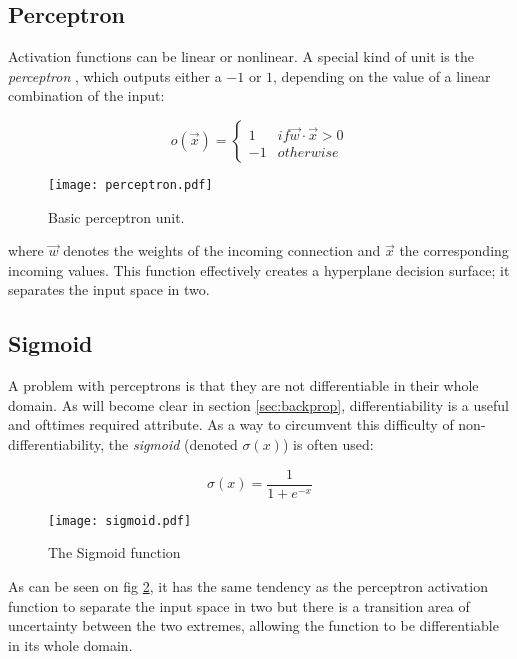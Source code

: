 \subsection{Perceptron}
Activation functions can be linear or nonlinear.
A special kind of unit is the \textit{perceptron}
\parencite{rosenblatt1958perceptron},
which outputs either a $-1$ or $1$,
depending on the value of a linear combination of the input:

\begin{equation}
\label{eq.perceptron}
o(\overrightarrow{x}) = \begin{cases}
1 & if \overrightarrow{w}\cdot\overrightarrow{x} > 0 \\
-1 & otherwise
\end{cases}
\end{equation}

\begin{figure}
\label{fig.ml.perceptron}
\center
\texttt{[image: perceptron.pdf]}
\caption{Basic perceptron unit.}
\end{figure}

where $\overrightarrow{w}$ denotes the weights of the incoming connection
and $\overrightarrow{x}$ the corresponding incoming values.
This function effectively creates a hyperplane decision surface;
it separates the input space in two.

\subsection{Sigmoid}
\label{sec:sigmoid}
A problem with perceptrons
is that they are not differentiable
in their whole domain.
As will become clear in section \ref{sec:backprop},
differentiability is a useful and ofttimes required attribute.
As a way to circumvent this difficulty of non-differentiability,
the \textit{sigmoid} (denoted $\sigma(x)$) is often used:

\begin{equation}
\label{eq.ml.sigmoid}
\sigma(x) = \frac{1}{1 + e^{-x}}
\end{equation}

\begin{figure}[h]
\center
\texttt{[image: sigmoid.pdf]}
\caption{The Sigmoid function}
\label{fig.ml.sigmoid}
\end{figure}

As can be seen on fig \ref{fig.ml.sigmoid},
it has the same tendency as the perceptron activation function
to separate the input space in two
but there is a transition area of uncertainty between the two extremes,
allowing the function to be differentiable in its whole domain.

